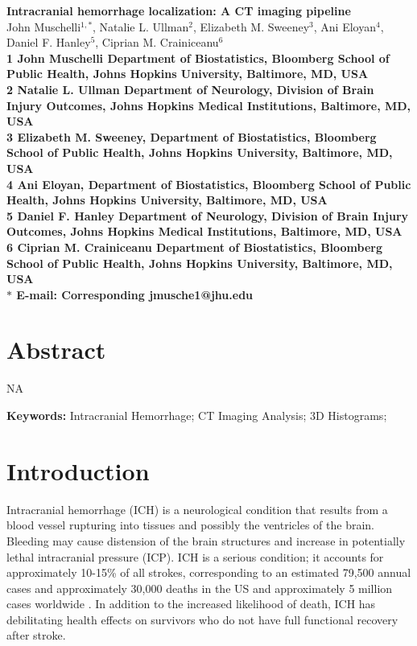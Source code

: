 \documentclass[10pt]{article}\usepackage[]{graphicx}\usepackage[]{color}
\date{}
\begin{document}
\begin{flushleft}
{\Large
\textbf{Intracranial hemorrhage localization: A CT imaging pipeline}
}
\\
John Muschelli$^{1,\ast}$,  
Natalie L. Ullman$^{2}$,
Elizabeth M. Sweeney$^{3}$,
Ani Eloyan$^{4}$,
Daniel F. Hanley$^{5}$,
Ciprian M. Crainiceanu$^{6}$
\\
\bf{1} John Muschelli Department of Biostatistics, Bloomberg School of Public Health, Johns Hopkins University, Baltimore, MD, USA
\\
\bf{2} Natalie L. Ullman Department of Neurology, Division of Brain Injury Outcomes,  Johns Hopkins Medical Institutions, Baltimore, MD, USA
\\
\bf{3} Elizabeth M. Sweeney, Department of Biostatistics, Bloomberg School of Public Health, Johns Hopkins University, Baltimore, MD, USA
\\
\bf{4} Ani Eloyan, Department of Biostatistics, Bloomberg School of Public Health, Johns Hopkins University, Baltimore, MD, USA
\\
\bf{5} Daniel F. Hanley Department of Neurology, Division of Brain Injury Outcomes,  Johns Hopkins Medical Institutions, Baltimore, MD, USA
\\
\bf{6} Ciprian M. Crainiceanu Department of Biostatistics, Bloomberg School of Public Health, Johns Hopkins University, Baltimore, MD, USA
\\
$\ast$ E-mail: Corresponding jmusche1@jhu.edu
\end{flushleft}


\section*{Abstract}

NA

{\bf Keywords:} Intracranial Hemorrhage; CT Imaging Analysis; 3D Histograms;










\section*{Introduction}

Intracranial hemorrhage (ICH) is a neurological condition that results from a blood vessel rupturing into tissues and possibly the ventricles of the brain.  Bleeding may cause distension of the brain structures and increase in potentially lethal intracranial pressure (ICP).  ICH is a serious condition; it accounts for approximately 10-15\% of all strokes, corresponding to an estimated 79,500 annual cases \citep{go_heart_2013} and approximately 30,000 deaths \citep{qureshi_spontaneous_2001} in the US and approximately 5 million cases worldwide \citep{krishnamurthi_global_2014}. In addition to the increased likelihood of death, ICH has debilitating health effects on survivors who do not have full functional recovery after stroke.
\end{document}
